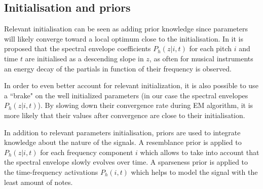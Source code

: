 \documentclass{article}
\begin{document}
\subsection{Initialisation and priors}
\label{sec:init-prior}

Relevant initialisation can be seen as adding prior knowledge since parameters will likely converge toward a local optimum close to the initialisation.
In \cite{Fuentes2013_PhD} it is proposed that the spectral envelope coefficients $P_h(z|i,t)$ for each pitch $i$ and time $t$ are initialised as a descending slope in $z$, as often for musical instruments an energy decay of the partials in function of their frequency is observed.

\vspace{0.1cm}

In order to even better account for relevant initialization, it is also possible to use a ``brake" on the well initialized parameters \cite{Fuentes_EUSCIPCO2014} (in our case the spectral envelopes $P_h(z|i,t)$). By slowing down their convergence rate during EM algorithm, it is more likely that their values after convergence are close to their initialisation.  

\vspace{0.1cm}

In addition to relevant parameters initialisation, priors are used to integrate knowledge about the nature of the signals. A resemblance prior \cite{Fuentes2013_PhD} is applied to $P_h(z|i,t)$ for each frequency component $i$ which allows to take into account that the spectral envelope slowly evolves over time. A sparseness prior is applied to the time-frequency activations $P_h(i,t)$ which helps to model the signal with the least amount of notes. 

\end{document}
